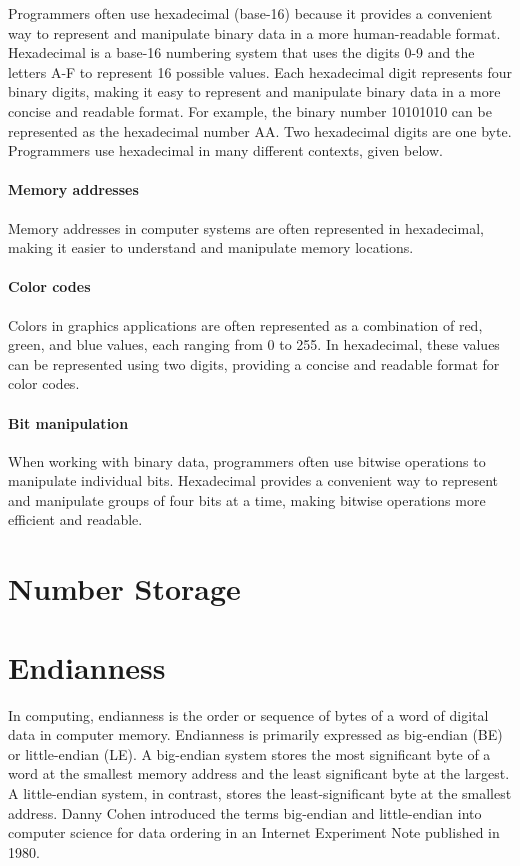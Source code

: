 \documentclass[11pt]{book}
\begin{document}
Programmers often use hexadecimal (base-16) because it provides a convenient way to represent and manipulate binary data in a more human-readable format. Hexadecimal is a base-16 numbering system that uses the digits 0-9 and the letters A-F to represent 16 possible values. Each hexadecimal digit represents four binary digits, making it easy to represent and manipulate binary data in a more concise and readable format. For example, the binary number 10101010 can be represented as the hexadecimal number AA. Two hexadecimal digits are one byte. Programmers use hexadecimal in many different contexts, given below.

\paragraph{Memory addresses} Memory addresses in computer systems are often represented in hexadecimal, making it easier to understand and manipulate memory locations. 

\paragraph{Color codes} Colors in graphics applications are often represented as a combination of red, green, and blue values, each ranging from 0 to 255. In hexadecimal, these values can be represented using two digits, providing a concise and readable format for color codes.

\paragraph{Bit manipulation} When working with binary data, programmers often use bitwise operations to manipulate individual bits. Hexadecimal provides a convenient way to represent and manipulate groups of four bits at a time, making bitwise operations more efficient and readable.

\section{Number Storage\label{sec:data:bin:endian}}

\section{Endianness\label{sec:data:bin:endian}}

In computing, endianness is the order or sequence of bytes of a word of digital data in computer memory. Endianness is primarily expressed as big-endian (BE) or little-endian (LE). A big-endian system stores the most significant byte of a word at the smallest memory address and the least significant byte at the largest. A little-endian system, in contrast, stores the least-significant byte at the smallest address. Danny Cohen introduced the terms big-endian and little-endian into computer science for data ordering in an Internet Experiment Note published in 1980. 
\end{document}
